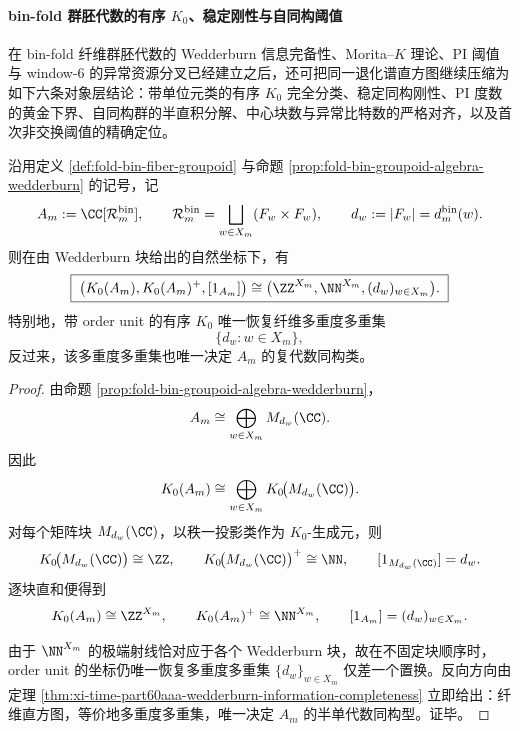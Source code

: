 \paragraph{bin-fold 群胚代数的有序 \texorpdfstring{$K_0$}{K0}、稳定刚性与自同构阈值}
在 bin-fold 纤维群胚代数的 Wedderburn 信息完备性、Morita--\(K\) 理论、PI 阈值与 window-\(6\) 的异常资源分叉已经建立之后，还可把同一退化谱直方图继续压缩为如下六条对象层结论：带单位元类的有序 \(K_0\) 完全分类、稳定同构刚性、PI 度数的黄金下界、自同构群的半直积分解、中心块数与异常比特数的严格对齐，以及首次非交换阈值的精确定位。

\begin{theorem}\label{thm:xi-time-part60acb-binfold-ordered-k0-complete-classification}
沿用定义 \ref{def:fold-bin-fiber-groupoid} 与命题 \ref{prop:fold-bin-groupoid-algebra-wedderburn} 的记号，记
\[
A_m:=\CC[\mathcal R_m^{\mathrm{bin}}],
\qquad
\mathcal R_m^{\mathrm{bin}}
=
\bigsqcup_{w\in X_m}(F_w\times F_w),
\qquad
d_w:=|F_w|=d_m^{\mathrm{bin}}(w).
\]
则在由 Wedderburn 块给出的自然坐标下，有
\[
\boxed{\;
\bigl(K_0(A_m),K_0(A_m)^+,[1_{A_m}]\bigr)
\cong
\bigl(\ZZ^{X_m},\NN^{X_m},(d_w)_{w\in X_m}\bigr).\;}
\]
特别地，带 order unit 的有序 \(K_0\) 唯一恢复纤维多重度多重集
\[
\{d_w:w\in X_m\},
\]
反过来，该多重度多重集也唯一决定 \(A_m\) 的复代数同构类。
\end{theorem}
\begin{proof}
由命题 \ref{prop:fold-bin-groupoid-algebra-wedderburn}，
\[
A_m\cong \bigoplus_{w\in X_m}M_{d_w}(\CC).
\]
因此
\[
K_0(A_m)\cong \bigoplus_{w\in X_m}K_0\!\bigl(M_{d_w}(\CC)\bigr).
\]
对每个矩阵块 \(M_{d_w}(\CC)\)，以秩一投影类作为 \(K_0\)-生成元，则
\[
K_0\!\bigl(M_{d_w}(\CC)\bigr)\cong \ZZ,
\qquad
K_0\!\bigl(M_{d_w}(\CC)\bigr)^+\cong \NN,
\qquad
[1_{M_{d_w}(\CC)}]=d_w.
\]
逐块直和便得到
\[
K_0(A_m)\cong \ZZ^{X_m},
\qquad
K_0(A_m)^+\cong \NN^{X_m},
\qquad
[1_{A_m}]=(d_w)_{w\in X_m}.
\]

由于 \(\NN^{X_m}\) 的极端射线恰对应于各个 Wedderburn 块，故在不固定块顺序时，order unit 的坐标仍唯一恢复多重度多重集 \(\{d_w\}_{w\in X_m}\) 仅差一个置换。反向方向由定理 \ref{thm:xi-time-part60aaa-wedderburn-information-completeness} 立即给出：纤维直方图，等价地多重度多重集，唯一决定 \(A_m\) 的半单代数同构型。证毕。
\end{proof}

